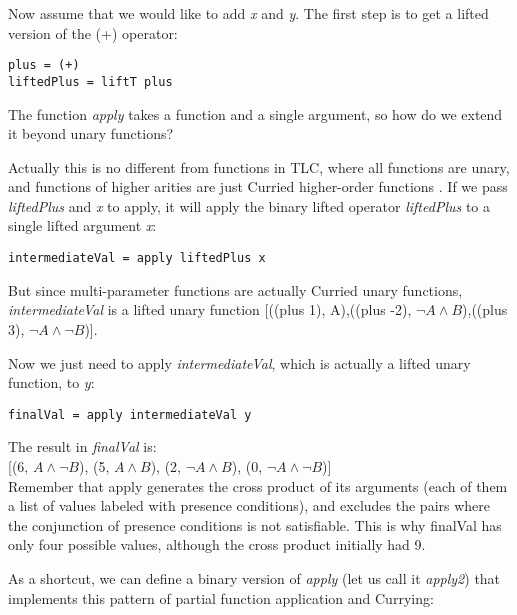 \documentclass[11pt]{article} %
\begin{document}
\begin{exmp}

Now assume that we would like to add \emph{x} and \emph{y}. The first step is to get a lifted version of the (+) operator:

\begin{verbatim}
plus = (+)
liftedPlus = liftT plus
\end{verbatim}

The function \emph{apply} takes a function and a single argument, so how do we extend it beyond unary functions?

Actually this is no different from functions in TLC, where all functions are unary, and functions of higher arities are just Curried higher-order functions \cite{Pierce2002}. If we pass \emph{liftedPlus} and \emph{x} to apply, it will apply the binary lifted operator \emph{liftedPlus} to a single lifted argument \emph{x}:

\begin{verbatim}
intermediateVal = apply liftedPlus x
\end{verbatim}

But since multi-parameter functions are actually Curried unary functions, \emph{intermediateVal} is a lifted unary function [((plus 1), A),((plus -2), $\neg A \wedge B$),((plus 3), $\neg A \wedge \neg B$)].

Now we just need to apply \emph{intermediateVal}, which is actually a lifted unary function, to \emph{y}:

\begin{verbatim}
finalVal = apply intermediateVal y
\end{verbatim}

The result in \emph{finalVal} is: \\

[(6, $A \wedge \neg B$), (5, $A \wedge B$), (2, $\neg A \wedge B$), (0, $\neg A \wedge \neg B$)] \\

Remember that apply generates the cross product of its arguments (each of them a list of values labeled with presence conditions), and excludes the pairs where the conjunction of presence conditions is not satisfiable. This is why finalVal has only four possible values, although the cross product initially had 9.

As a shortcut, we can define a binary version of \emph{apply} (let us call it \emph{apply2}) that implements this pattern of partial function application and Currying:


\end{exmp}
\end{document}
